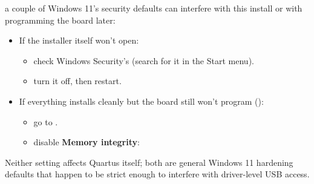 \noindent{}a couple of Windows 11's security defaults can interfere with this
install or with programming the board later:
\begin{itemize}
  \item If the installer itself won't open:
  \begin{itemize}
    \item check Windows Security's  (search for it in the Start menu).
    \item turn it off, then restart.
  \end{itemize}
  \item If everything installs cleanly but the board still won't program ():
  \begin{itemize}
    \item go to .
    \item disable \textbf{Memory integrity}:
  \end{itemize}
\end{itemize}


\noindent Neither setting affects Quartus itself; both are general Windows 11 hardening defaults
that happen to be strict enough to interfere with driver-level USB access.

